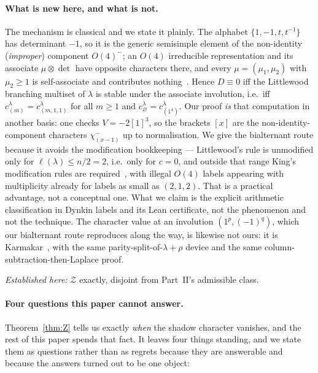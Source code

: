 \documentclass[11pt,a4paper]{article}
\begin{document}
\paragraph{What is new here, and what is not.} The mechanism is classical and we state it
plainly. The alphabet $\{1,-1,t,t^{-1}\}$ has determinant $-1$, so it is the generic
semisimple element of the non-identity (\emph{improper}) component $O(4)^-$; an $O(4)$ irreducible
representation and its associate $\mu\otimes\det$ have opposite characters there, and every
$\mu=(\mu_1,\mu_2)$ with $\mu_2\ge1$ is self-associate and contributes
nothing~\cite[Thm.~5]{Brauer}. Hence $D\equiv0$ iff the Littlewood branching multiset of
$\lambda$ is stable under the associate involution, i.e.\ iff
$c^\lambda_{(m)}=c^\lambda_{(m,1,1)}$ for all $m\ge1$ and $c^\lambda_\varnothing
=c^\lambda_{(1^4)}$. Our proof \emph{is} that computation in another basis: one checks
$V=-2[1]^3$, so the brackets $[x]$ are the non-identity-component characters
$\chi^-_{(x-1)}$ up to normalisation. We give the bialternant route because it avoids the
modification bookkeeping --- Littlewood's rule is unmodified only for
$\ell(\lambda)\le n/2=2$, i.e.\ only for $c=0$, and outside that range King's modification
rules are required~\cite{King71,Newell,Brauer}, with illegal $O(4)$ labels appearing with
multiplicity already for labels as small as $(2,1,2)$. That is a practical advantage, not a
conceptual one. What we claim is the explicit arithmetic classification in Dynkin labels and
its Lean certificate, not the phenomenon and not the technique. The character value at an
involution $(1^p,(-1)^q)$, which our bialternant route reproduces along the way, is likewise
not ours: it is Karmakar~\cite[Thm.~4.1]{Karmakar}, with the same parity-split-of-$\lambda+\rho$
device and the same column-subtraction-then-Laplace proof.

\emph{Established here:} $\mathcal Z$ exactly, disjoint from Part~II's admissible class.

\paragraph{Four questions this paper cannot answer.} Theorem~\ref{thm:Z} tells us exactly
\emph{when} the shadow character vanishes, and the rest of this paper spends that fact. It
leaves four things standing, and we state them as questions rather than as regrets because they
are answerable and because the answers turned out to be one object:
\end{document}
